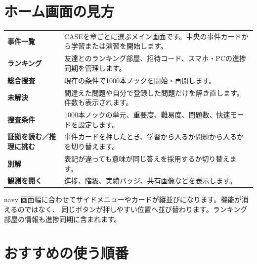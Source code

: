 \documentclass[11pt,a4paper]{ltjsarticle}
\begin{document}
\section*{ホーム画面の見方}

\begin{tabularx}{\linewidth}{>{\bfseries}p{32mm}X}
事件一覧 & CASEを章ごとに選ぶメイン画面です。中央の事件カードから学習または演習を開始します。\\
ランキング & 友達とのランキング部屋、招待コード、スマホ・PCの進捗同期を管理します。\\
総合捜査 & 現在の条件で1000本ノックを開始・再開します。\\
未解決 & 間違えた問題や自分で登録した問題だけを解き直します。件数も表示されます。\\
捜査条件 & 1000本ノックの単元、重要度、難易度、問題数、快速モードを設定します。\\
証拠を読む／推理に挑む & 事件カードを押したとき、学習から入るか問題から入るかを切り替えます。\\
別解 & 表記が違っても意味が同じ答えを採用するか切り替えます。\\
観測を開く & 進捗、階級、実績バッジ、共有画像などを表示します。\\
\end{tabularx}

\begin{casebox}[スマホでの表示]{navy}
画面幅に合わせてサイドメニューやカードが縦並びになります。機能が消えるのではなく、
同じボタンが押しやすい位置へ並び替わります。ランキング部屋の情報も進捗同期に含まれます。
\end{casebox}

\section*{おすすめの使う順番}
\end{document}
